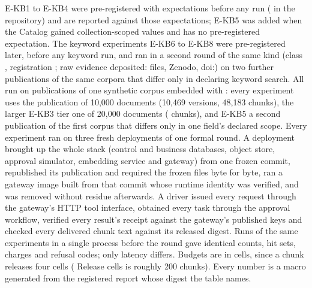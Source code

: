 \documentclass[journal,onecolumn]{IEEEtran}
\newcommand{\code}[1]{\texttt{\detokenize{#1}}}
\begin{document}
E-KB1 to E-KB4 were pre-registered with expectations before any run
(\code{docs/kb_experiment_design.md} in the repository) and are reported
against those expectations; E-KB5 was added when the Catalog gained
collection-scoped values and has no pre-registered expectation. The keyword
experiments E-KB6 to E-KB8 were pre-registered later, before any keyword run,
and ran in a second round of the same kind (class
\texttt{\KbKeywordEvidenceClass}, registration \KbKeywordRegistrationDigest;
raw evidence deposited: \KbKeywordRawEvidenceFiles{} files, Zenodo,
doi:\KbKeywordRawEvidenceDOI{}) on two further publications of the same
corpora that differ only in declaring keyword search. All run on
publications of one synthetic corpus embedded with \code{bge-m3}: every
experiment uses the publication of 10{,}000 documents (10{,}469 versions,
48{,}183 chunks), the larger E-KB3 tier one of 20{,}000 documents
(\KbEkbThreeNinetySixKChunks{} chunks), and E-KB5 a second publication of the
first corpus that differs only in one field's declared scope. Every
experiment ran on three fresh deployments of one formal round. A deployment
brought up the whole stack (control and business databases, object store,
approval simulator, embedding service and gateway) from one frozen commit,
republished its publication and required the frozen files byte for byte,
ran a gateway image built from that commit whose runtime identity was
verified, and was removed without residue afterwards. A driver issued every
request through the gateway's HTTP tool interface, obtained every task
through the approval workflow, verified every result's receipt against the
gateway's published keys and checked every delivered chunk text against its
released digest. Runs of the same experiments in a single process before the
round gave identical counts, hit sets, charges and refusal codes; only
latency differs. Budgets are in
cells, since a chunk releases four cells (\KbEkbOneReleaseBudget{} Release
cells is roughly 200 chunks). Every number is a macro generated from the
registered report whose digest the table names.
\end{document}
